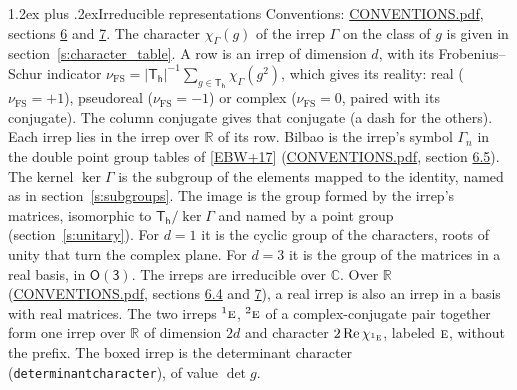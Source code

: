 \documentclass[10pt,a4paper]{article}
\makeatletter
\renewcommand\section{\@startsection{section}{1}{\z@}{-3ex plus -1ex minus -.2ex}%
  {1.2ex plus .2ex}{\normalfont\large\sffamily\bfseries\color{parttitle}}}
\numberwithin{equation}{section}
\newcommand{\grp}[1]{\mathsf{#1}}
\newcommand{\irr}[1]{\text{\normalfont\scshape #1}}
\newcommand{\conjpair}[1]{{}^{#1}}
\newcommand{\irchar}[1]{\chi_{#1}}
\newcommand{\fsind}{\nu_{\mathrm{FS}}}
\makeatother
\begin{document}
\section{Irreducible representations}\label{s:irreps}
Conventions: \href{../../CONVENTIONS.pdf}{CONVENTIONS.pdf}, sections \href{../../CONVENTIONS.pdf\#conv.6}{6} and \href{../../CONVENTIONS.pdf\#conv.7}{7}.
\leavevmode\label{n:function.character}\label{n:irrep.Gamma}The character $\irchar{\Gamma}(g)$ of the irrep $\Gamma$ on the class of $g$ is given in section~\ref{s:character_table}.
\leavevmode\label{n:index.dimension}\label{n:index.frobenius}\label{n:head.irrep}\label{n:head.reality}A row is an irrep of dimension $d$, with its Frobenius--Schur indicator $\fsind = |\grp{T_{h}}|^{-1}\allowbreak\sum_{g\in\grp{T_{h}}}\irchar{\Gamma}(g^2)$, which gives its reality: real ($\fsind = +1$), pseudoreal ($\fsind = -1$) or complex ($\fsind = 0$, paired with its conjugate). \label{n:head.conjugate}The column conjugate gives that conjugate (a dash for the others). \label{n:head.over.real}Each irrep lies in the irrep over $\mathbb{R}$ of its row. \label{n:head.bilbao}\label{n:irrep.alias.gamma}Bilbao is the irrep's symbol $\Gamma_n$ in the double point group tables of [\href{../../../REFERENCES.pdf\#ref.EBW+17}{EBW+17}] (\href{../../CONVENTIONS.pdf}{CONVENTIONS.pdf}, section \href{../../CONVENTIONS.pdf\#conv.6.5}{6.5}). \label{n:head.kernel}The kernel $\ker\Gamma$ is the subgroup of the elements mapped to the identity, named as in section~\ref{s:subgroups}. \label{n:head.image}The image is the group formed by the irrep's matrices, isomorphic to $\grp{T_{h}}/\ker\Gamma$ and named by a point group (section~\ref{s:unitary}). For $d = 1$ it is the cyclic group of the characters, roots of unity that turn the complex plane. For $d = 3$ it is the group of the matrices in a real basis, in \href{O3.pdf}{$\grp{O(3)}$}. The irreps are irreducible over $\mathbb{C}$. Over $\mathbb{R}$ (\href{../../CONVENTIONS.pdf}{CONVENTIONS.pdf}, sections \href{../../CONVENTIONS.pdf\#conv.6.4}{6.4} and \href{../../CONVENTIONS.pdf\#conv.7}{7}), a real irrep is also an irrep in a basis with real matrices. The two irreps $\conjpair{1}\irr{e}$, $\conjpair{2}\irr{e}$ of a complex-conjugate pair together form one irrep over $\mathbb{R}$ of dimension $2d$ and character $2\operatorname{Re}\irchar{\conjpair{1}\irr{e}}$, labeled $\irr{e}$, without the prefix. \label{n:mark.determinant}The boxed irrep is the determinant character (\texttt{determinantcharacter}), of value $\det g$.
\setlength{\emergencystretch}{2em}\par\setlength{\emergencystretch}{0pt}
\end{document}
